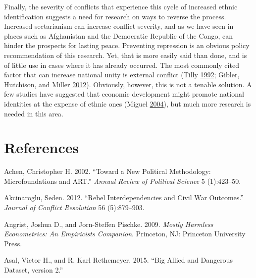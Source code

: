 \documentclass[12pt,]{book}
\theoremstyle{definition}
\theoremstyle{definition}
\theoremstyle{definition}
\theoremstyle{remark}
\begin{document}
Finally, the severity of conflicts that experience this cycle of
increased ethnic identification suggests a need for research on ways to
reverse the process. Increased sectarianism can increase conflict
severity, and as we have seen in places such as Afghanistan and the
Democratic Republic of the Congo, can hinder the prospects for lasting
peace. Preventing repression is an obvious policy recommendation of this
research. Yet, that is more easily said than done, and is of little use
in cases where it has already occurred. The most commonly cited factor
that can increase national unity is external conflict (Tilly
\protect\hyperlink{ref-Tilly1992}{1992}; Gibler, Hutchison, and Miller
\protect\hyperlink{ref-Gibler2012}{2012}). Obviously, however, this is
not a tenable solution. A few studies have suggested that economic
development might promote national identities at the expense of ethnic
ones (Miguel \protect\hyperlink{ref-Miguel2004b}{2004}), but much more
research is needed in this area.

\backmatter

\hypertarget{references}{%
\chapter*{References}\label{references}}


\indent

\setlength{\parindent}{-0.2in}\setlength{\leftskip}{0.2in}\setlength{\parskip}{8pt}

\singlespacing

\hypertarget{refs}{}
\leavevmode\hypertarget{ref-Achen2002a}{}%
Achen, Christopher H. 2002. ``Toward a New Political Methodology:
Microfoundations and ART.'' \emph{Annual Review of Political Science} 5
(1):423--50.

\leavevmode\hypertarget{ref-Akcinaroglu2012}{}%
Akcinaroglu, Seden. 2012. ``Rebel Interdependencies and Civil War
Outcomes.'' \emph{Journal of Conflict Resolution} 56 (5):879--903.

\leavevmode\hypertarget{ref-Angrist2009}{}%
Angrist, Joshua D., and Jorn-Steffen Pischke. 2009. \emph{Mostly
Harmless Econometrics: An Empiricists Companion}. Princeton, NJ:
Princeton University Press.

\leavevmode\hypertarget{ref-Asal2015}{}%
Asal, Victor H., and R. Karl Rethemeyer. 2015. ``Big Allied and
Dangerous Dataset, version 2.''
\end{document}

